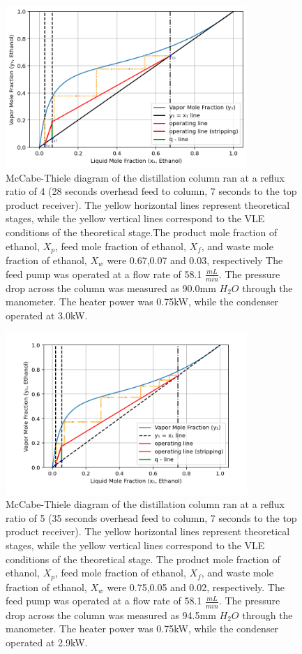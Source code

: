 \documentclass[lettersize,journal]{IEEEtran}
\begin{document}
	
	\begin{figure}[!t]
		\centering
		\includegraphics[width=3.6in]{reflux4}
		\caption{McCabe-Thiele diagram of the distillation column ran at a reflux ratio of 4 (28 seconds overhead feed to column, 7 seconds to the top product receiver). The yellow horizontal lines represent theoretical stages, while the yellow vertical lines correspond to the VLE conditions of the theoretical stage.The product mole fraction of ethanol, $X_{p}$, feed mole fraction of ethanol, $X_{f}$, and waste mole fraction of ethanol, $X_{w}$ were 0.67,0.07 and 0.03, respectively The feed pump was operated at a flow rate of 58.1 $\frac{mL}{min}$. The pressure drop across the column was measured as 90.0mm $H_{2}O$ through the manometer. The heater power was 0.75kW, while the condenser operated at 3.0kW.} 
		\label{fig_2}
	\end{figure}
	\begin{figure}[!t]
		\centering
		\includegraphics[width=3.6in]{reflux5}
		\caption{McCabe-Thiele diagram of the distillation column ran at a reflux ratio of 5 (35 seconds overhead feed to column, 7 seconds to the top product receiver). The yellow horizontal lines represent theoretical stages, while the yellow vertical lines correspond to the VLE conditions of the theoretical stage. The product mole fraction of ethanol, $X_{p}$, feed mole fraction of ethanol, $X_{f}$, and waste mole fraction of ethanol, $X_{w}$ were 0.75,0.05 and 0.02, respectively. The feed pump was operated at a flow rate of 58.1 $\frac{mL}{min}$. The pressure drop across the column was measured as 94.5mm $H_{2}O$ through the manometer. The heater power was 0.75kW, while the condenser operated at 2.9kW.} 
		\label{fig_3}
	\end{figure}
	
\end{document}

